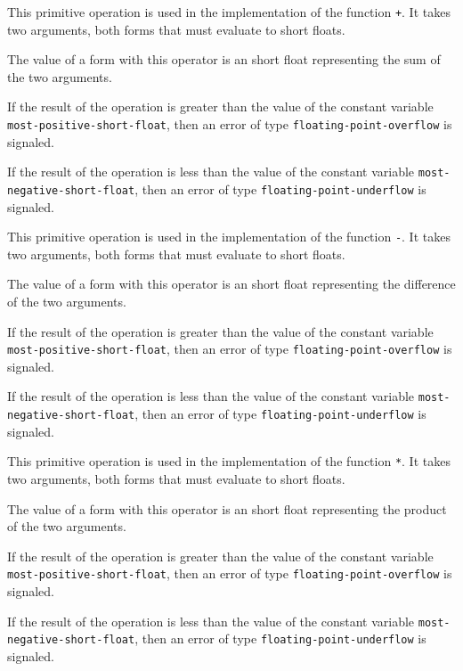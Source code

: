  {}

This primitive operation is used in the implementation of the
\commonlisp{} function \texttt{+}.  It takes two arguments, both forms
that must evaluate to short floats.

The value of a form with this operator is an short float
representing the sum of the two arguments.

If the result of the operation is greater than the value of the
constant variable \texttt{most-positive-short-float}, then an error of
type \texttt{floating-point-overflow} is signaled.

If the result of the operation is less than the value of the
constant variable \texttt{most-negative-short-float}, then an error of
type \texttt{floating-point-underflow} is signaled.

 {}

This primitive operation is used in the implementation of the
\commonlisp{} function \texttt{-}.  It takes two arguments, both forms
that must evaluate to short floats.

The value of a form with this operator is an short float
representing the difference of the two arguments.

If the result of the operation is greater than the value of the
constant variable \texttt{most-positive-short-float}, then an error of
type \texttt{floating-point-overflow} is signaled.

If the result of the operation is less than the value of the
constant variable \texttt{most-negative-short-float}, then an error of
type \texttt{floating-point-underflow} is signaled.

 {}

This primitive operation is used in the implementation of the
\commonlisp{} function \texttt{*}.  It takes two arguments, both forms
that must evaluate to short floats.

The value of a form with this operator is an short float
representing the product of the two arguments.

If the result of the operation is greater than the value of the
constant variable \texttt{most-positive-short-float}, then an error of
type \texttt{floating-point-overflow} is signaled.

If the result of the operation is less than the value of the constant
variable \texttt{most-negative-short-float}, then an error of type
\texttt{floating-point-underflow} is signaled.

